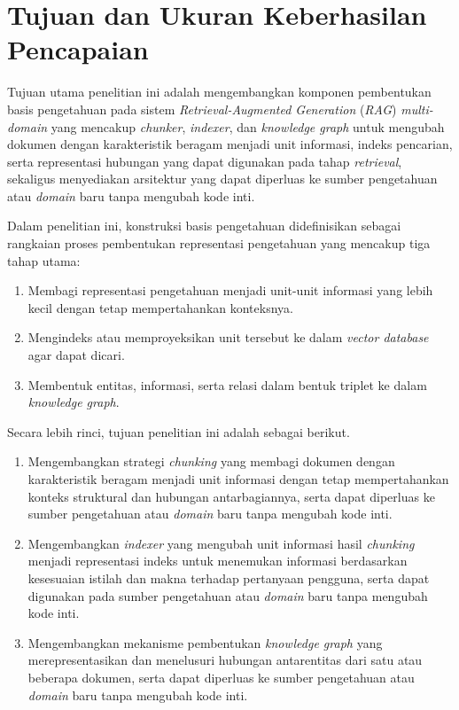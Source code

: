 \section{Tujuan dan Ukuran Keberhasilan Pencapaian}

Tujuan utama penelitian ini adalah mengembangkan komponen pembentukan basis
pengetahuan pada sistem \emph{Retrieval-Augmented Generation} (\emph{RAG})
\emph{multi-domain} yang mencakup \emph{chunker}, \emph{indexer}, dan \emph{knowledge
graph} untuk mengubah dokumen dengan karakteristik beragam menjadi unit
informasi, indeks pencarian, serta representasi hubungan yang dapat digunakan
pada tahap \emph{retrieval}, sekaligus menyediakan arsitektur yang dapat
diperluas ke sumber pengetahuan atau \emph{domain} baru tanpa mengubah kode inti.

Dalam penelitian ini, konstruksi basis pengetahuan didefinisikan sebagai rangkaian
proses pembentukan representasi pengetahuan yang mencakup tiga tahap utama:

\begin{enumerate}
    \item Membagi representasi pengetahuan menjadi unit-unit informasi yang lebih kecil dengan tetap mempertahankan konteksnya.
    \item Mengindeks atau memproyeksikan unit tersebut ke dalam \emph{vector database} agar dapat dicari.
    \item Membentuk entitas, informasi, serta relasi dalam bentuk triplet ke dalam \emph{knowledge graph}.
\end{enumerate}

\noindent Secara lebih rinci, tujuan penelitian ini adalah sebagai berikut.

\begin{enumerate}
    \item Mengembangkan strategi \emph{chunking} yang membagi dokumen dengan karakteristik beragam menjadi unit informasi dengan tetap mempertahankan konteks struktural dan hubungan antarbagiannya, serta dapat diperluas ke sumber pengetahuan atau \emph{domain} baru tanpa mengubah kode inti.
    \item Mengembangkan \emph{indexer} yang mengubah unit informasi hasil \emph{chunking} menjadi representasi indeks untuk menemukan informasi berdasarkan kesesuaian istilah dan makna terhadap pertanyaan pengguna, serta dapat digunakan pada sumber pengetahuan atau \emph{domain} baru tanpa mengubah kode inti.
    \item Mengembangkan mekanisme pembentukan \emph{knowledge graph} yang merepresentasikan dan menelusuri hubungan antarentitas dari satu atau beberapa dokumen, serta dapat diperluas ke sumber pengetahuan atau \emph{domain} baru tanpa mengubah kode inti.
\end{enumerate}

